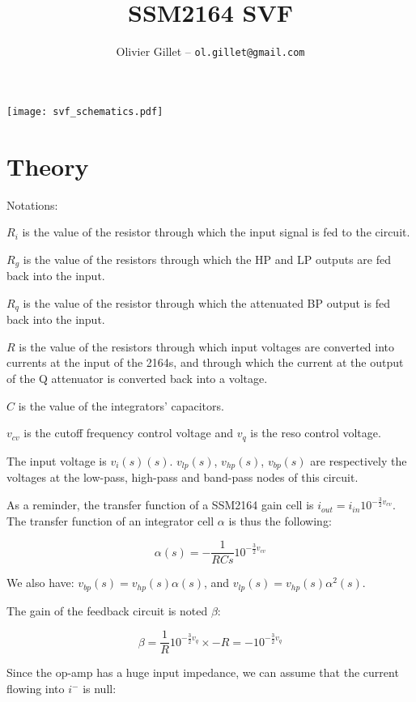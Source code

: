 \documentclass[a4paper,11pt]{article}
\title{SSM2164 SVF}
\author{Olivier Gillet -- \tt ol.gillet@gmail.com}
\date{}
\begin{document}
\maketitle

\texttt{[image: svf\_schematics.pdf]}

\section{Theory}

Notations:

$R_i$ is the value of the resistor through which the input signal is fed to the circuit.

$R_g$ is the value of the resistors through which the HP and LP outputs are fed back into the input.

$R_q$ is the value of the resistor through which the attenuated BP output is fed back into the input.

$R$ is the value of the resistors through which input voltages are converted into currents at the input of the 2164s, and through which the current at the output of the Q attenuator is converted back into a voltage.

$C$ is the value of the integrators' capacitors.

$v_{cv}$ is the cutoff frequency control voltage and $v_{q}$ is the reso control voltage.


The input voltage is $v_i(s)(s)$. $v_{lp}(s)$, $v_{hp}(s)$, $v_{bp}(s)$ are respectively the voltages at the low-pass, high-pass and band-pass nodes of this circuit.

As a reminder, the transfer function of a SSM2164 gain cell is $i_{out} = i_{in} 10^{-\frac{3}{2} v_{cv}}$. The transfer function of an integrator cell $\alpha$ is thus the following:

\begin{equation}
\alpha(s) = -\frac{1}{RCs} 10^{-\frac{3}{2} v_{cv}}
\end{equation}

We also have: $v_{bp}(s) = v_{hp}(s) \alpha(s)$, and $v_{lp}(s) = v_{hp}(s) \alpha^2(s)$.

The gain of the feedback circuit is noted $\beta$:

\begin{equation}
\beta = \frac{1}{R} 10^{-\frac{3}{2} v_{q}} \times -R = -10^{-\frac{3}{2} v_{q}}
\end{equation}

Since the op-amp has a huge input impedance, we can assume that the current flowing into $i^-$ is null:
\end{document}

